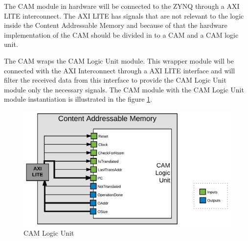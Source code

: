 The CAM module in hardware will be connected to the ZYNQ through a AXI LITE interconnect. The AXI LITE has signals that are not relevant to the logic inside the Content Addressable Memory and because of that the hardware implementation of the CAM should be divided in to a CAM and a CAM logic unit.

The CAM wraps the CAM Logic Unit module. This wrapper module will be connected with the AXI Interconnect through a AXI LITE interface and will filter the received data from this interface to provide the CAM Logic Unit module only the necessary signals. The CAM module with the CAM Logic Unit module instantiation is illustrated in the figure \ref{fig:CAM_HwLogic}.

\begin{figure} [H]
	\centering
	\includegraphics[scale = 0.25]{Images/CAM_HwLogic.png}
	\caption{CAM Logic Unit}
	\label{fig:CAM_HwLogic}
\end{figure}

